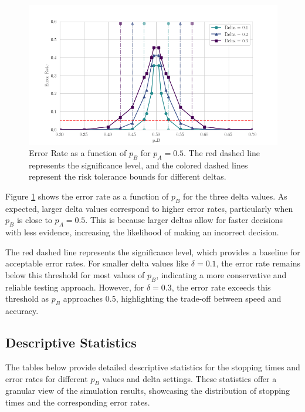 \documentclass[magisterska, english]{pwr_wmat_praca_dyplomowa}
\theoremstyle{plain}
\numberwithin{theorem}{chapter}
\theoremstyle{definition}
\numberwithin{theorem}{chapter}
\begin{document}
\begin{figure}[H]
	\centering
	\includegraphics[width=\textwidth]{images/delta_error_rate.png}
	\caption{Error Rate as a function of \( p_B \) for \( p_A = 0.5 \). The red dashed line represents the significance level, and the colored dashed lines represent the risk tolerance bounds for different deltas.}
	\label{fig:error_rate_pa05}
\end{figure}

Figure \ref{fig:error_rate_pa05} shows the error rate as a function of \( p_B \) for the three delta values. As expected, larger delta values correspond to higher error rates, particularly when \( p_B \) is close to \( p_A = 0.5 \). This is because larger deltas allow for faster decisions with less evidence, increasing the likelihood of making an incorrect decision.

The red dashed line represents the significance level, which provides a baseline for acceptable error rates. For smaller delta values like \( \delta = 0.1 \), the error rate remains below this threshold for most values of \( p_B \), indicating a more conservative and reliable testing approach. However, for \( \delta = 0.3 \), the error rate exceeds this threshold as \( p_B \) approaches 0.5, highlighting the trade-off between speed and accuracy.

\subsection{Descriptive Statistics}

The tables below provide detailed descriptive statistics for the stopping times and error rates for different \( p_B \) values and delta settings. These statistics offer a granular view of the simulation results, showcasing the distribution of stopping times and the corresponding error rates.
\end{document}
